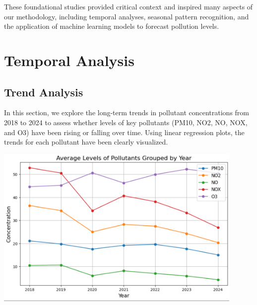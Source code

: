 \documentclass{modeleRapport}
\begin{document}
These foundational studies provided critical context and inspired many aspects of our methodology, 
including temporal analyses, seasonal pattern recognition, and the application of machine learning 
models to forecast pollution levels.\\



\newpage
\section{Temporal Analysis}

\subsection{Trend Analysis}

In this section, we explore the long-term trends in pollutant concentrations from 2018 to 2024 to assess whether levels 
of key pollutants (PM10, NO2, NO, NOX, and O3) have been rising or falling over time. Using linear regression plots, 
the trends for each pollutant have been clearly visualized.\\

\begin{center}
    \includegraphics[width=12cm]{Images/PollutantsPerYear.png}
\end{center}
\end{document}

